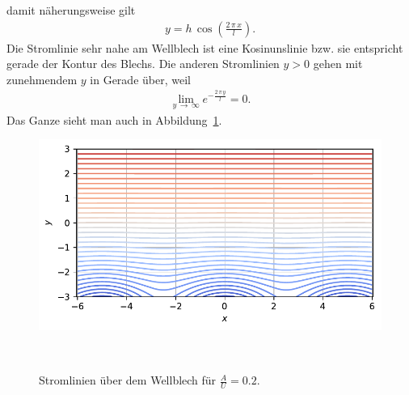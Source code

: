 damit näherungsweise gilt
\begin{align*}
    y
    =
    h\,\cos\left(\frac{2\,\pi\,x}{l}\right).
\end{align*}
Die Stromlinie sehr nahe am Wellblech ist eine
Kosinunslinie bzw. sie entspricht gerade der Kontur
des Blechs.
Die anderen Stromlinien $y > 0$ gehen mit zunehmendem $y$
in Gerade über, weil
\begin{align*}
    \lim_{y\,\to\,\infty}
    e^{-\frac{2\,\pi\,y}{l}}
    =
    0.
\end{align*}
Das Ganze sieht man auch in Abbildung~\ref{fig:stromlinien}.
\begin{figure}
    \centering
    \includegraphics[width=\textwidth]{papers/ueberschall/figures/Stromlinien.pdf}
    \caption{Stromlinien über dem Wellblech für $\frac{A}{U}=0.2$.}
    ~\label{fig:stromlinien}  
\end{figure}

